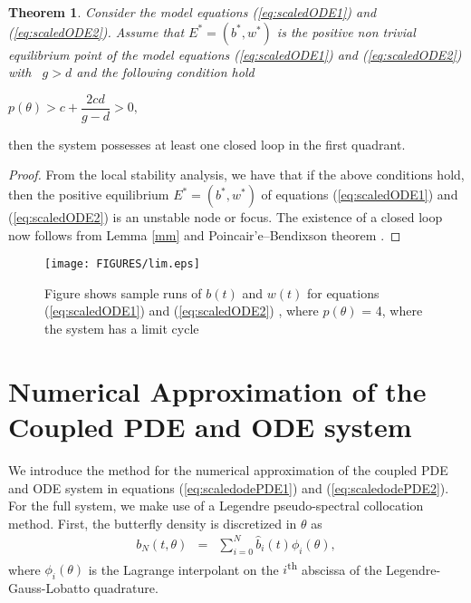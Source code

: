 \documentclass[review,authoryear]{elsarticle}
\newtheorem{theorem}{Theorem}[section]
\begin{document}
\begin{theorem}
   Consider the model equations (\ref{eq:scaledODE1}) and
  (\ref{eq:scaledODE2}). Assume that $E^{\ast }=(b^{\ast },w^{\ast })$
  is the positive non trivial equilibrium point of the model equations
  (\ref{eq:scaledODE1}) and (\ref{eq:scaledODE2}) with \ $g>d$ and the
  following condition hold
\end{theorem}

\begin{center}
$%
p(\theta )>c+\dfrac{2cd}{g-d}>0,$
\end{center}

then the system possesses at least one closed loop in the first quadrant.

\begin{proof}
  From the local stability analysis, we have that if the above
  conditions hold, then the positive equilibrium
  $E^{\ast }=(b^{\ast },w^{\ast })$ of equations (\ref{eq:scaledODE1})
  and (\ref{eq:scaledODE2}) is an unstable node or focus. The
  existence of a closed loop now follows from Lemma \ref{mm} and
  Poincair'e--Bendixson theorem \citep{nonlinearChaos}.
\end{proof}

\begin{figure}[!htp]
\begin{center}
\texttt{[image: FIGURES/lim.eps]}  

\end{center}

\caption{Figure shows sample runs of $b(t)$ and $w(t)$ for equations
  (\ref{eq:scaledODE1}) and (\ref{eq:scaledODE2}) , where
  $p(\theta )$ = 4, where the system has a limit cycle }
      \label{fig:lim}
\end{figure}


\section{Numerical Approximation of the Coupled PDE and ODE system}
\label{numericalApproximation}

We introduce the method for the numerical approximation of the coupled
PDE and ODE system in equations (\ref{eq:scaledodePDE1}) and
(\ref{eq:scaledodePDE2}). For the full system, we make use of a
Legendre pseudo-spectral collocation
method\citep{spectralMethodsFluids,hesthaven_gottlieb_gottlieb_2007,gottlieb1977numerical}. First,
the butterfly density is discretized in $\theta$ as
\begin{eqnarray}
  \label{eqn:spatialDiscretization}
  b_N(t,\theta) & = & \sum^N_{i=0} \hat{b}_i(t) \phi_i(\theta),
\end{eqnarray}
where $\phi_i(\theta)$ is the Lagrange interpolant on the
$i$\textsuperscript{th} abscissa of the Legendre-Gauss-Lobatto
quadrature\citep{hesthaven_gottlieb_gottlieb_2007}.
\end{document}
